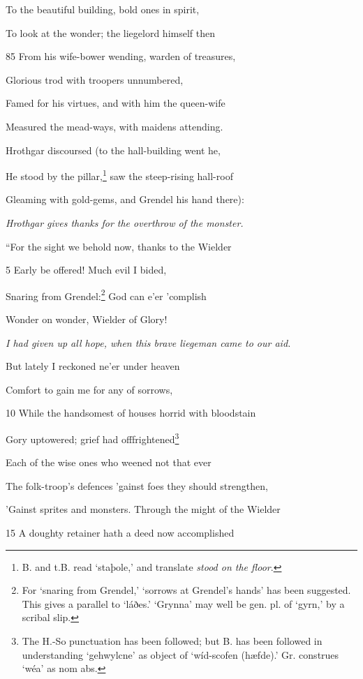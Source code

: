 To the beautiful building, bold ones in spirit,

To look at the wonder; the liegelord himself then

85
From his wife-bower wending, warden of treasures,

Glorious trod with troopers unnumbered,

Famed for his virtues, and with him the queen-wife

Measured the mead-ways, with maidens attending.



Hrothgar discoursed (to the hall-building went he,

He stood by the pillar,\footnote{B. and t.B. read ‘staþole,’ and translate \emph{stood on the floor}.} saw the steep-rising hall-roof

Gleaming with gold-gems, and Grendel his hand there):

\emph{Hrothgar gives
thanks for the
overthrow of the
monster.}

“For the sight we behold now, thanks to the Wielder

5
Early be offered! Much evil I bided,

Snaring from Grendel:\footnote{For ‘snaring from Grendel,’ ‘sorrows at Grendel’s hands’ has been suggested.
This gives a parallel to ‘láðes.’ ‘Grynna’ may well be gen. pl. of
‘gyrn,’ by a scribal slip.} God can e’er ’complish

Wonder on wonder, Wielder of Glory!

\emph{I had given up all
hope, when this
brave liegeman
came to our aid.}

But lately I reckoned ne’er under heaven

Comfort to gain me for any of sorrows,

10
While the handsomest of houses horrid with bloodstain

Gory uptowered; grief had offfrightened\footnote{The H.-So punctuation has been followed; but B. has been followed in
understanding ‘gehwylcne’ as object of ‘wíd-scofen (hæfde).’ Gr. construes
‘wéa’ as nom abs.}

Each of the wise ones who weened not that ever

The folk-troop’s defences ’gainst foes they should strengthen,

’Gainst sprites and monsters. Through the might of the Wielder

15
A doughty retainer hath a deed now accomplished

